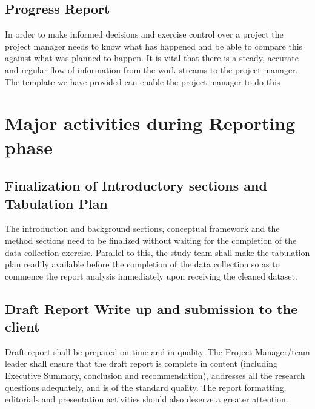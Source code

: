 \documentclass[
]{book}
\theoremstyle{definition}
\theoremstyle{definition}
\theoremstyle{definition}
\theoremstyle{definition}
\theoremstyle{remark}
\begin{document}
\hypertarget{progress-report}{%
\subsection{Progress Report}\label{progress-report}}

In order to make informed decisions and exercise control over a project the project manager needs to know what has happened and be able to compare this against what was planned to happen. It is vital that there is a steady, accurate and regular flow of information from the work streams to the project manager. The template we have provided can enable the project manager to do this

\hypertarget{major-activities-during-reporting-phase}{%
\section{Major activities during Reporting phase}\label{major-activities-during-reporting-phase}}

\hypertarget{finalization-of-introductory-sections-and-tabulation-plan}{%
\subsection{Finalization of Introductory sections and Tabulation Plan}\label{finalization-of-introductory-sections-and-tabulation-plan}}

The introduction and background sections, conceptual framework and the method sections need to be finalized without waiting for the completion of the data collection exercise. Parallel to this, the study team shall make the tabulation plan readily available before the completion of the data collection so as to commence the report analysis immediately upon receiving the cleaned dataset.

\hypertarget{draft-report-write-up-and-submission-to-the-client}{%
\subsection{Draft Report Write up and submission to the client}\label{draft-report-write-up-and-submission-to-the-client}}

Draft report shall be prepared on time and in quality. The Project Manager/team leader shall ensure
that the draft report is complete in content (including Executive Summary, conclusion and recommendation), addresses all the research questions adequately, and is of the standard quality. The report formatting, editorials and presentation activities should also deserve a greater attention.
\end{document}

